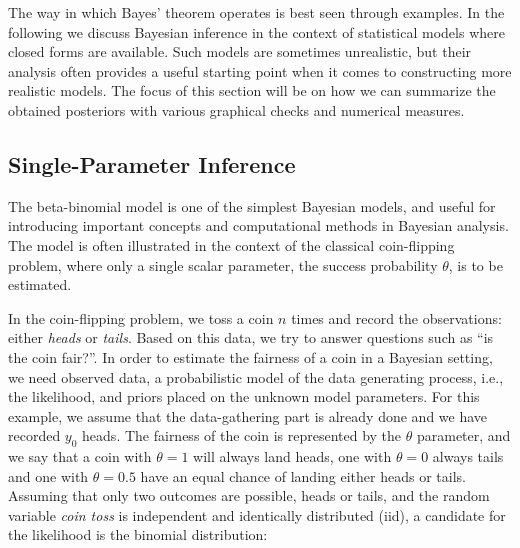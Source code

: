 The way in which Bayes' theorem operates is best seen through examples. In the following we discuss Bayesian inference in the context of statistical models where closed forms are available. Such models are sometimes unrealistic, but their analysis often provides a useful starting point when it comes to constructing more realistic models. The focus of this section will be on how we can summarize the obtained posteriors with various graphical checks and numerical measures. 


\subsection{Single-Parameter Inference}\label{sec:coin_flipping}

The beta-binomial model is one of the simplest Bayesian models, and useful for introducing important concepts and computational methods in Bayesian analysis. The model is often illustrated in the context of the classical coin-flipping problem, where only a single scalar parameter, the success probability $\theta$, is to be estimated. 

In the coin-flipping problem, we toss a coin $n$ times and record the observations: either \textit{heads} or \textit{tails}. Based on this data, we try to answer questions such as “is the coin fair?”. In order to estimate the fairness of a coin in a Bayesian setting, we need observed data, a probabilistic model of the data generating process, i.e., the likelihood, and priors placed on the unknown model parameters. For this example, we assume that the data-gathering part is already done and we have recorded $y_0$ heads. The fairness of the coin is represented by the $\theta$ parameter, and we say that a coin with $\theta=1$ will always land heads, one with $\theta=0$ always tails and one with $\theta=0.5$ have an equal chance of landing either heads or tails. Assuming that only two outcomes are possible, heads or tails, and the random variable \textit{coin toss} is independent and identically distributed (iid), a candidate for the likelihood is the binomial distribution: 

